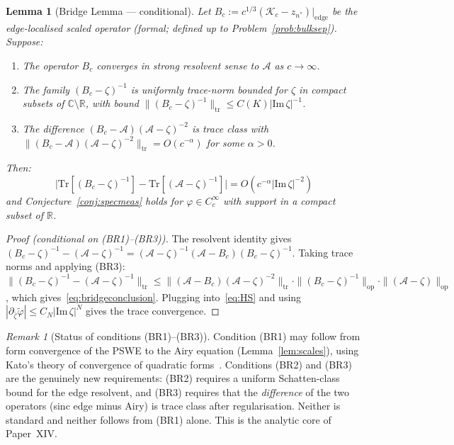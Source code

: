 \documentclass[12pt,a4paper]{amsart}
\newtheorem{lemma}[theorem]{Lemma}
\theoremstyle{definition}
\theoremstyle{remark}
\newtheorem{remark}[theorem]{Remark}
\newcommand{\Kc}{\mathcal{K}_c}
\newcommand{\Tr}{\mathrm{Tr}}
\newcommand{\cA}{\mathcal{A}}
\newcommand{\R}{\mathbb{R}}
\newcommand{\C}{\mathbb{C}}
\newcommand{\op}{\mathrm{op}}
\newcommand{\tr}{\mathrm{tr}}
\begin{document}
\begin{lemma}[Bridge Lemma --- conditional]
\label{lem:bridge}
Let $B_c := c^{1/3}(\Kc - z_{n^*})|_{\mathrm{edge}}$ be the
edge-localised scaled operator (formal; defined up to Problem~\ref{prob:bulksep}).
Suppose:
\begin{enumerate}[label=(BR\arabic*),nosep]
 \item The operator $B_c$ converges in \emph{strong resolvent sense}
 to $\cA$ as $c\to\infty$.
 \item The family $(B_c - \zeta)^{-1}$ is uniformly trace-norm
 bounded for $\zeta$ in compact subsets of $\C\setminus\R$,
 with bound $\|(B_c-\zeta)^{-1}\|_{\tr} \leq C(K)|\mathrm{Im}\,\zeta|^{-1}$.
 \item The difference $(B_c - \cA)(\cA - \zeta)^{-2}$ is trace class
 with $\|(B_c - \cA)(\cA-\zeta)^{-2}\|_{\tr} = O(c^{-\alpha})$
 for some $\alpha > 0$.
\end{enumerate}
Then:
\begin{equation}\label{eq:bridgeconclusion}
 \bigl|\Tr[(B_c - \zeta)^{-1}] - \Tr[(\cA-\zeta)^{-1}]\bigr|
 = O(c^{-\alpha}|\mathrm{Im}\,\zeta|^{-2})
\end{equation}
and Conjecture~\ref{conj:specmeas} holds for $\varphi \in C_c^\infty$
with support in a compact subset of $\R$.
\end{lemma}

\begin{proof}[Proof (conditional on (BR1)--(BR3))]
The resolvent identity gives
$(B_c-\zeta)^{-1} - (\cA-\zeta)^{-1}
 = (\cA-\zeta)^{-1}(\cA-B_c)(B_c-\zeta)^{-1}$.
Taking trace norms and applying (BR3):
$\|(B_c-\zeta)^{-1}-(\cA-\zeta)^{-1}\|_{\tr}
\leq \|(\cA-B_c)(\cA-\zeta)^{-2}\|_{\tr}\cdot
\|(B_c-\zeta)^{-1}\|_{\op}\cdot\|(\cA-\zeta)\|_{\op}$,
which gives~\eqref{eq:bridgeconclusion}.
Plugging into~\eqref{eq:HS} and using $|\partial_{\bar\zeta}\tilde\varphi| \leq C_N|\mathrm{Im}\,\zeta|^N$
gives the trace convergence.
\end{proof}

\begin{remark}[Status of conditions (BR1)--(BR3)]
Condition (BR1) may follow from form convergence of the PSWE
to the Airy equation (Lemma~\ref{lem:scales}), using Kato's
theory of convergence of quadratic forms~\cite{Kato1966}.
Conditions (BR2) and (BR3) are the genuinely new requirements:
(BR2) requires a uniform Schatten-class bound for the edge resolvent,
and (BR3) requires that the \emph{difference} of the two operators
(sinc edge minus Airy) is trace class after regularisation.
Neither is standard and neither follows from (BR1) alone.
This is the analytic core of Paper~XIV.
\end{remark}
\end{document}

